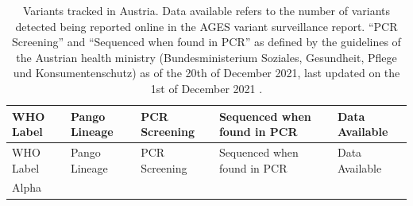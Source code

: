 \documentclass[
]{article}
\begin{document}
\begin{longtable}[]{@{}lllll@{}}
\caption{\label{tab:variantstracked} Variants tracked in Austria. Data available refers to the number of variants detected being reported online in the AGES variant surveillance report. ``PCR Screening'' and ``Sequenced when found in PCR'' as defined by the guidelines of the Austrian health ministry (Bundesministerium Soziales, Gesundheit, Pflege und Konsumentenschutz) as of the 20th of December 2021, last updated on the 1st of December 2021 \autocite{holzerStrategieZurVirusvariantensurveillance}.}\tabularnewline
\toprule
\begin{minipage}[b]{0.11\columnwidth}\raggedright
WHO Label\strut
\end{minipage} & \begin{minipage}[b]{0.15\columnwidth}\raggedright
Pango Lineage\strut
\end{minipage} & \begin{minipage}[b]{0.15\columnwidth}\raggedright
PCR Screening\strut
\end{minipage} & \begin{minipage}[b]{0.29\columnwidth}\raggedright
Sequenced when found in PCR\strut
\end{minipage} & \begin{minipage}[b]{0.16\columnwidth}\raggedright
Data Available\strut
\end{minipage}\tabularnewline
\midrule
\endfirsthead
\toprule
\begin{minipage}[b]{0.11\columnwidth}\raggedright
WHO Label\strut
\end{minipage} & \begin{minipage}[b]{0.15\columnwidth}\raggedright
Pango Lineage\strut
\end{minipage} & \begin{minipage}[b]{0.15\columnwidth}\raggedright
PCR Screening\strut
\end{minipage} & \begin{minipage}[b]{0.29\columnwidth}\raggedright
Sequenced when found in PCR\strut
\end{minipage} & \begin{minipage}[b]{0.16\columnwidth}\raggedright
Data Available\strut
\end{minipage}\tabularnewline
\midrule
\endhead
\begin{minipage}[t]{0.11\columnwidth}\raggedright
Alpha\strut
\end{minipage} & \begin{minipage}[t]{0.15\columnwidth}\raggedright

\end{minipage}
\end{longtable}
\end{document}
